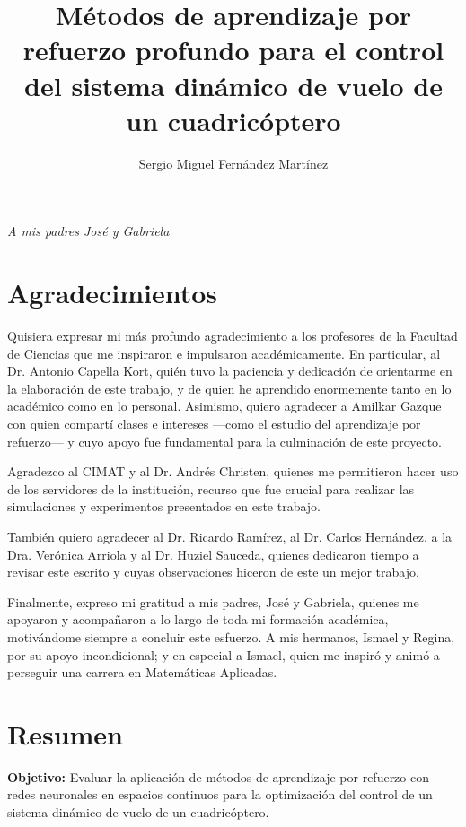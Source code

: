 \documentclass[letterpaper, 12pt, oneside]{book}
\author{Sergio Miguel Fernández Martínez}
\title{
Métodos de aprendizaje por refuerzo profundo para el control del sistema dinámico de vuelo de un cuadricóptero}
\theoremstyle{plain}
\begin{document}
\frontmatter
\maketitle

\chapter*{}
\begin{flushright}%
  \emph{A mis padres José y Gabriela}
  \thispagestyle{empty}
\end{flushright}

\chapter*{Agradecimientos}
\begin{onehalfspace}
Quisiera expresar mi más profundo agradecimiento a los profesores de la Facultad de Ciencias que me inspiraron e impulsaron académicamente. En particular, al Dr. Antonio Capella Kort, quién tuvo la paciencia y dedicación de orientarme en la elaboración de este trabajo, y de quien he aprendido enormemente tanto en lo académico como en lo personal. Asimismo, quiero agradecer a Amilkar Gazque con quien compartí clases e intereses —como el estudio del aprendizaje por refuerzo— y cuyo apoyo fue fundamental para la culminación de este proyecto.

Agradezco al CIMAT y al Dr. Andrés Christen, quienes me permitieron hacer uso de los servidores de la institución, recurso que fue crucial para realizar las simulaciones y experimentos presentados en este trabajo.

También quiero agradecer al Dr. Ricardo Ramírez, al Dr. Carlos Hernández, a la Dra. Verónica Arriola y al Dr. Huziel Sauceda, quienes dedicaron tiempo a revisar este escrito y cuyas observaciones hiceron de este un mejor trabajo.  

Finalmente, expreso mi gratitud a mis padres, José y Gabriela, quienes me apoyaron y acompañaron a lo largo de toda mi formación académica, motivándome siempre a concluir este esfuerzo. A mis hermanos, Ismael y Regina, por su apoyo incondicional; y en especial a Ismael, quien me inspiró y animó a perseguir una carrera en Matemáticas Aplicadas.
\end{onehalfspace}



\chapter*{Resumen}
\textbf{Objetivo:} Evaluar la aplicación de métodos de aprendizaje por refuerzo con redes neuronales en espacios continuos para la optimización del control de un sistema dinámico de vuelo de un cuadricóptero.
\end{document}
